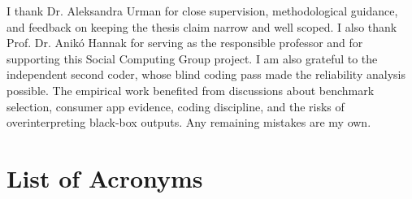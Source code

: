 \documentclass{ddis-thesis}
\begin{document}
\begin{acknowledgements}
\begingroup
\raggedright
{}
I thank Dr. Aleksandra Urman for close supervision, methodological guidance, and
feedback on keeping the thesis claim narrow and well scoped. I also thank Prof.
Dr. Anik\'o Hannak for serving as the responsible professor and for supporting
this Social Computing Group project. I am also grateful to the independent
second coder, whose blind coding pass made the reliability analysis possible. The
empirical work benefited from discussions about benchmark selection, consumer app
evidence, coding discipline, and the risks of overinterpreting black-box
outputs. Any remaining mistakes are my own.
\par
\endgroup
\end{acknowledgements}

\tableofcontents
\clearpage
\listoftables
\clearpage
\listoffigures
\clearpage

\glsresetall










{}
\printbibliography[title={Bibliography}]

\cleardoublepage
{}
{}
\chapter*{List of Acronyms}
\glsaddall
\printglossary[type=\acronymtype]

\appendix

\end{document}
